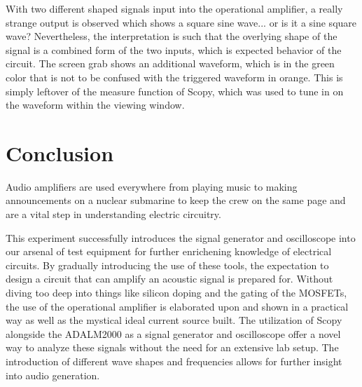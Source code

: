 \documentclass[12pt]{article}
\begin{document}
With two different shaped signals input into the operational amplifier, a really
strange output is observed which shows a square sine wave... or is it a sine
square wave? Nevertheless, the interpretation is such that the overlying shape
of the signal is a combined form of the two inputs, which is expected behavior
of the circuit. The screen grab shows an additional waveform, which is in the
green color that is not to be confused with the triggered waveform in orange.
This is simply leftover of the measure function of Scopy, which was used to tune
in on the waveform within the viewing window.

\section{Conclusion}

Audio amplifiers are used everywhere from playing music to
making announcements on a nuclear submarine to keep the crew on the same page
and are a vital step in understanding electric circuitry.

This experiment successfully introduces the signal generator and oscilloscope
into our arsenal of test equipment for further enrichening knowledge of
electrical circuits. By gradually introducing the use of these tools, the
expectation to design a circuit that can amplify an acoustic signal is prepared
for. Without diving too deep into things like silicon doping and the gating of
the MOSFETs, the use of the operational amplifier is elaborated upon and shown
in a practical way as well as the mystical ideal current source built.
The utilization of Scopy alongside the ADALM2000 as a signal generator and
oscilloscope offer a novel way to analyze these signals without the need for an
extensive lab setup. The introduction of different wave shapes and frequencies
allows for further insight into audio generation.
\end{document}
